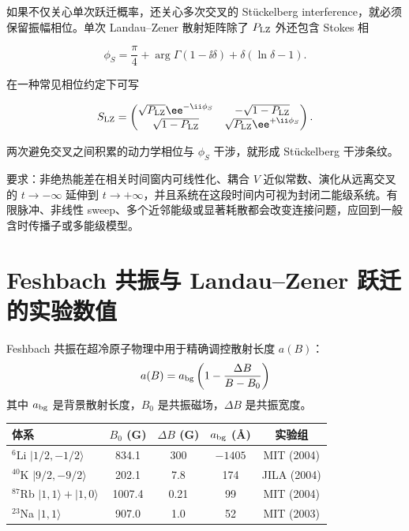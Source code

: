 如果不仅关心单次跃迁概率，还关心多次交叉的 Stückelberg interference，就必须保留振幅相位。单次 Landau--Zener 散射矩阵除了 \(P_{\rm LZ}\) 外还包含 Stokes 相

\begin{equation}
\phi_S
=\frac\pi4
+\arg\Gamma(1-\ii\delta)
+\delta(\ln\delta-1).
\label{eq:lz-stokes-phase}
\end{equation}

在一种常见相位约定下可写

\[
S_{\rm LZ}
=\begin{pmatrix}
\sqrt{P_{\rm LZ}}\ee^{-\ii\phi_S}&-\sqrt{1-P_{\rm LZ}}\\
\sqrt{1-P_{\rm LZ}}&\sqrt{P_{\rm LZ}}\ee^{+\ii\phi_S}
\end{pmatrix}.
\]

两次避免交叉之间积累的动力学相位与 \(\phi_S\) 干涉，就形成 St\"uckelberg 干涉条纹。

\begin{note}
 要求：非绝热能差在相关时间窗内可线性化、耦合 \(V\) 近似常数、演化从远离交叉的 \(t\to-\infty\) 延伸到 \(t\to+\infty\)，并且系统在这段时间内可视为封闭二能级系统。有限脉冲、非线性 sweep、多个近邻能级或显著耗散都会改变连接问题，应回到一般含时传播子或多能级模型。
\end{note}

\section{Feshbach 共振与 Landau--Zener 跃迁的实验数值}\label{sec:resonance-experiments}

Feshbach 共振在超冷原子物理中用于精确调控散射长度 \(a(B)\)：
\[
a(B)=a_{\rm bg}\left(1-\frac{\Delta B}{B-B_0}\right)
\]
其中 \(a_{\rm bg}\) 是背景散射长度，\(B_0\) 是共振磁场，\(\Delta B\) 是共振宽度。

\begin{center}
\begin{tabular}{lcccc}
\hline
体系 & \(B_0\) (G) & \(\Delta B\) (G) & \(a_{\rm bg}\) (\AA) & 实验组 \\
\hline
\(^6\)Li \(|1/2,-1/2\rangle\) & 834.1 & 300 & \(-1405\) & MIT (2004) \\
\(^{40}\)K \(|9/2,-9/2\rangle\) & 202.1 & 7.8 & 174 & JILA (2004) \\
\(^{87}\)Rb \(|1,1\rangle+|1,0\rangle\) & 1007.4 & 0.21 & 99 & MIT (2004) \\
\(^{23}\)Na \(|1,1\rangle\) & 907.0 & 1.0 & 52 & MIT (2003) \\
\hline
\end{tabular}
\end{center}


